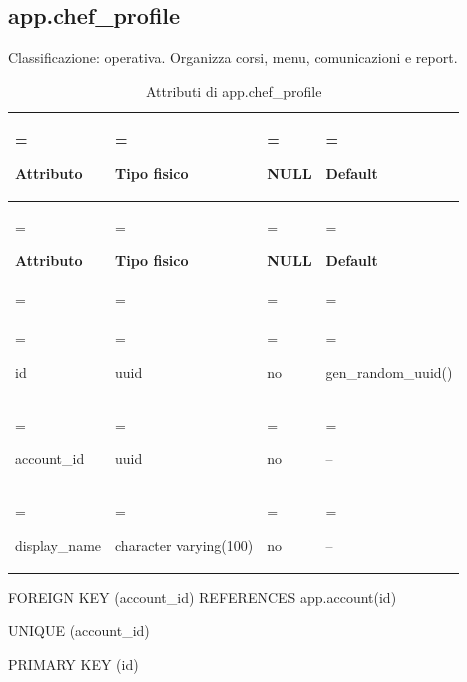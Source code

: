 \documentclass[11pt,a4paper]{article}
\begin{document}
\subsection{app.chef\_profile}

Classificazione: operativa. Organizza corsi, menu, comunicazioni e report.

{\small \renewcommand{\arraystretch}{1.2}

\begin{xltabular}{\linewidth}{>{\hsize\linewidth=\hsize\raggedright\arraybackslash}X>{\hsize\linewidth=\hsize\raggedright\arraybackslash}X>{\hsize\linewidth=\hsize\raggedright\arraybackslash}X>{\hsize\linewidth=\hsize\raggedright\arraybackslash}X}
\caption{Attributi di app.chef\_profile}\label{tab:dictionary-10}\\
\toprule

\textbf{Attributo} & \textbf{Tipo fisico} & \textbf{NULL} & \textbf{Default}\\\midrule\endfirsthead\toprule\textbf{Attributo} & \textbf{Tipo fisico} & \textbf{NULL} & \textbf{Default}\\\midrule\endhead
\midrule{}\\\endfoot\bottomrule\endlastfoot


{\ttfamily\small id} & {\ttfamily\small uuid} & no & {\ttfamily\small gen\_\allowbreak{}random\_\allowbreak{}uuid(\allowbreak{})}\\\addlinespace[3pt]

{\ttfamily\small account\_\allowbreak{}id} & {\ttfamily\small uuid} & no & {\ttfamily\small --}\\\addlinespace[3pt]

{\ttfamily\small display\_\allowbreak{}name} & {\ttfamily\small character varying(\allowbreak{}100)} & no & {\ttfamily\small --}\\*

\end{xltabular}}

{\ttfamily\small FOREIGN KEY (\allowbreak{}account\_\allowbreak{}id) REFERENCES app.\allowbreak{}account(\allowbreak{}id)}\par

{\ttfamily\small UNIQUE (\allowbreak{}account\_\allowbreak{}id)}\par

{\ttfamily\small PRIMARY KEY (\allowbreak{}id)}\par
\end{document}
